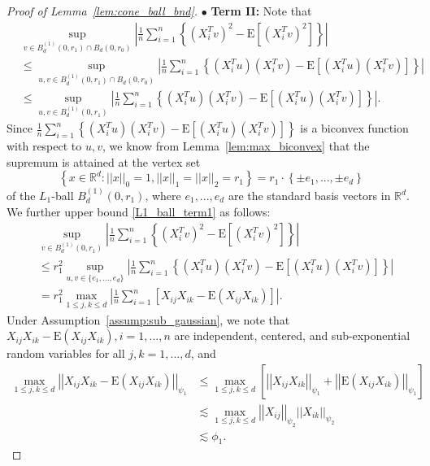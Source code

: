 \documentclass[ejsv2,noshowframe]{imsart}
\theoremstyle{plain}
\theoremstyle{definition}
\theoremstyle{remark}
\newcommand{\norm}[1]{\left|\left| #1 \right|\right|}
\begin{document}
\begin{proof}[Proof of Lemma~\ref{lem:cone_ball_bnd}]
	$\bullet$ {\bf Term II:} Note that
	\begin{align}
		\label{L1_ball_term1}
		\nonumber&\sup_{v\in  B_d^{(1)}(0,r_1) \cap B_d(0,r_0)} \left|\frac{1}{n} \sum_{i=1}^n \left\{(X_i^Tv)^2 - \mathrm{E}\left[(X_i^Tv)^2\right] \right\}\right| \\ \nonumber
		&\leq \sup_{u,v\in  B_d^{(1)}(0,r_1) \cap B_d(0,r_0)} \left|\frac{1}{n} \sum_{i=1}^n \left\{(X_i^Tu) (X_i^Tv) - \mathrm{E}\left[(X_i^Tu) (X_i^Tv)\right] \right\}\right|\\ 
		&\leq \sup_{u,v \in B_d^{(1)}(0,r_1)} \left|\frac{1}{n} \sum_{i=1}^n \left\{(X_i^Tu) (X_i^Tv) - \mathrm{E}\left[(X_i^Tu) (X_i^Tv)\right] \right\}\right|.
	\end{align}
	Since $\frac{1}{n} \sum_{i=1}^n \left\{(X_i^Tu) (X_i^Tv) - \mathrm{E}\left[(X_i^Tu) (X_i^Tv)\right] \right\}$ is a biconvex function with respect to $u,v$, we know from Lemma~\ref{lem:max_biconvex} that the supremum is attained at the vertex set 
	$$\left\{x\in \mathbb{R}^d: \norm{x}_0=1, \norm{x}_1=\norm{x}_2=r_1 \right\} = r_1 \cdot \left\{\pm e_1,...,\pm e_d\right\}$$ 
	of the $L_1$-ball $B_d^{(1)}(0,r_1)$, where $e_1,...,e_d$ are the standard basis vectors in $\mathbb{R}^d$. We further upper bound \eqref{L1_ball_term1} as follows:  
	\begin{align*}
		&\sup_{v\in  B_d^{(1)}(0,r_1)} \left|\frac{1}{n} \sum_{i=1}^n \left\{(X_i^Tv)^2 - \mathrm{E}\left[(X_i^Tv)^2\right] \right\}\right| \\
		&\leq r_1^2 \sup_{u,v \in \{e_1,...,e_d\}} \left|\frac{1}{n} \sum_{i=1}^n \left\{(X_i^Tu) (X_i^Tv) - \mathrm{E}\left[(X_i^Tu) (X_i^Tv)\right] \right\}\right|\\
		&= r_1^2 \max_{1\leq j, k \leq d} \left|\frac{1}{n} \sum_{i=1}^n \left[ X_{ij}X_{ik} - \mathrm{E}\left(X_{ij}X_{ik}\right)\right]\right|.
	\end{align*}
	Under Assumption~\ref{assump:sub_gaussian}, we note that $X_{ij}X_{ik} - \mathrm{E}\left(X_{ij}X_{ik}\right), i=1,...,n$ are independent, centered, and sub-exponential random variables for all $j,k=1,...,d$, and
	\begin{align*}
		\max_{1\leq j, k \leq d}\norm{X_{ij}X_{ik} - \mathrm{E}\left(X_{ij}X_{ik}\right)}_{\psi_1} &\leq \max_{1\leq j, k \leq d}\left[\norm{X_{ij} X_{ik}}_{\psi_1} + \norm{\mathrm{E}\left(X_{ij} X_{ik}\right)}_{\psi_1}\right] \\
		&\lesssim \max_{1\leq j, k \leq d}\norm{X_{ij}}_{\psi_2} \norm{X_{ik}}_{\psi_2}\\
		&\lesssim \phi_1.

\end{align*}
\end{proof}
\end{document}
